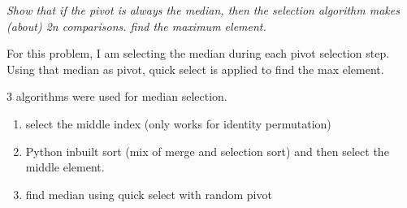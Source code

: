 \documentclass{homeworg}
\begin{document}
\newpage

\exercise
\emph{Show that if the pivot is always the median, then the selection algorithm makes (about) 2n comparisons. 
find the maximum element.}

For this problem, I am selecting the median during each pivot selection step. Using that median as pivot, quick select is applied to find the max element.

3 algorithms were used for median selection. 
\begin{enumerate}
    \item select the middle index (only works for identity permutation)
    \item Python inbuilt sort (mix of merge and selection sort) and then select the middle element.
    \item find median using quick select with random pivot
\end{enumerate}
\end{document}
